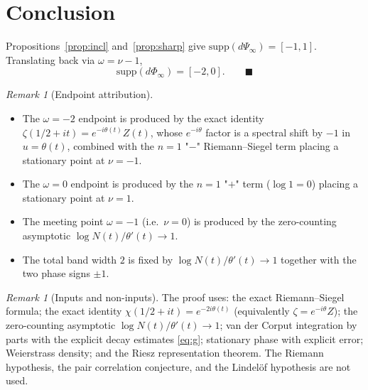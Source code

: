 \documentclass[11pt]{article}
\theoremstyle{definition}
\theoremstyle{remark}
\newtheorem{remark}[theorem]{Remark}
\begin{document}
\section{Conclusion}

Propositions~\ref{prop:incl} and~\ref{prop:sharp} give
$\mathrm{supp}(d\Psi_\infty)=[-1,1]$.  Translating back via
$\omega=\nu-1$,
\[
  \mathrm{supp}(d\Phi_\infty)=[-2,0].\qquad\blacksquare
\]

\begin{remark}[Endpoint attribution]
\leavevmode
\begin{itemize}
\item The $\omega=-2$ endpoint is produced by the exact identity
  $\zeta(1/2+it)=e^{-i\theta(t)}Z(t)$, whose $e^{-i\theta}$ factor is
  a spectral shift by $-1$ in $u=\theta(t)$, combined with the
  $n=1$ "$-$" Riemann--Siegel term placing a stationary point at
  $\nu=-1$.
\item The $\omega=0$ endpoint is produced by the $n=1$ "$+$" term
  ($\log 1=0$) placing a stationary point at $\nu=1$.
\item The meeting point $\omega=-1$ (i.e.\ $\nu=0$) is produced by the
  zero-counting asymptotic $\log N(t)/\theta'(t)\to 1$.
\item The total band width $2$ is fixed by $\log N(t)/\theta'(t)\to 1$
  together with the two phase signs $\pm 1$.
\end{itemize}
\end{remark}

\begin{remark}[Inputs and non-inputs]
The proof uses: the exact Riemann--Siegel formula; the exact
identity $\chi(1/2+it)=e^{-2i\theta(t)}$ (equivalently
$\zeta=e^{-i\theta}Z$); the zero-counting asymptotic
$\log N(t)/\theta'(t)\to 1$; van der Corput integration by parts
with the explicit decay estimates \eqref{eq:g}; stationary phase
with explicit error; Weierstrass density; and the Riesz
representation theorem.  The Riemann hypothesis, the pair correlation
conjecture, and the Lindelöf hypothesis are not used.
\end{remark}
\end{document}
